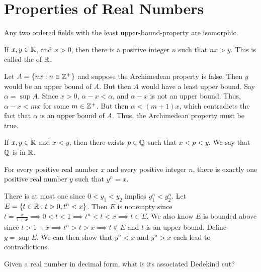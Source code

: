 \documentclass{mathnotes}
\begin{document}
\section*{Properties of Real Numbers}

\begin{thm}
  Any two ordered fields with the least upper-bound-property are isomorphic.
\end{thm}

\begin{thm}
  If $x,y\in\mathbb{R}$, and $x>0$, then there is a positive integer $n$ such that
  $nx>y$. This is called the  of $\mathbb{R}$.
\end{thm}

\begin{pf}
  Let $A=\{nx:n\in\mathbb{Z}^+\}$ and suppose the Archimedean property is false. Then
  $y$ would be an upper bound of $A$. But then $A$ would have a least upper
  bound. Say $\alpha=\sup A$. Since $x>0$, $\alpha-x<\alpha$, and $\alpha-x$ is
  not an upper bound. Thus, $\alpha-x<mx$ for some $m\in\mathbb{Z}^+$. But then
  $\alpha<(m+1)x$, which contradicts the fact that $\alpha$ is an upper bound
  of $A$. Thus, the Archimedean property must be true.
\end{pf}

\begin{thm}
  If $x,y\in\mathbb{R}$ and $x<y$, then there exists $p\in\mathbb{Q}$ such that $x<p<y$. We
  say that $\mathbb{Q}$ is  in $\mathbb{R}$.
\end{thm}

\begin{thm}
  For every positive real number $x$ and every positive integer $n$, there is
  exactly one positive real number $y$ such that $y^n=x$.
\end{thm}

\begin{pf}
  There is at most one since $0<y_1<y_2$ implies $y_1^n<y_2^n$. Let
  $E=\{t\in\mathbb{R}:t>0,t^n<x\}$. Then $E$ is nonempty since
  $t=\frac{x}{1+x}\implies0<t<1\implies t^n<t<x\implies t\in E$. We also know
  $E$ is bounded above since $t>1+x\implies t^n>t>x\implies t\notin E$ and $t$
  is an upper bound. Define $y=\sup E$. We can then show that $y^n<x$ and
  $y^n>x$ each lead to contradictions.
\end{pf}

\begin{ques}
  Given a real number in decimal form, what is its associated Dedekind cut?
\end{ques}
\end{document}
